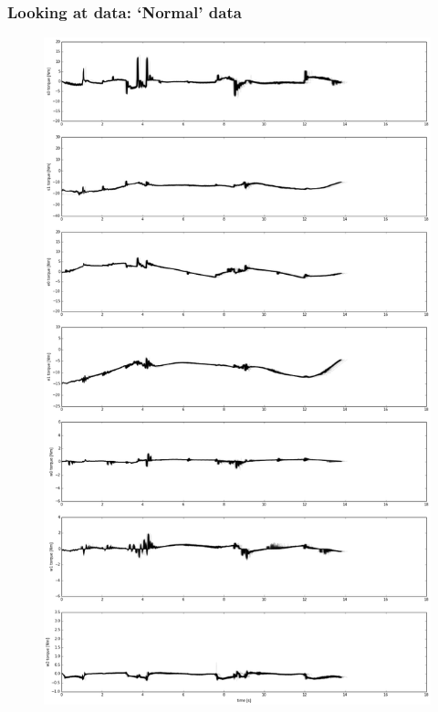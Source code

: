 \documentclass{beamer}
\newcommand{\datawidth}{.43\textwidth}
\begin{document}
    \begin{frame}
    	\frametitle{Looking at data: `Normal' data}
    	\begin{figure}
            \centering
            \includegraphics[width=\datawidth]{figs/no_anomaly3.png}
        \end{figure}
    \end{frame}
\end{document}
